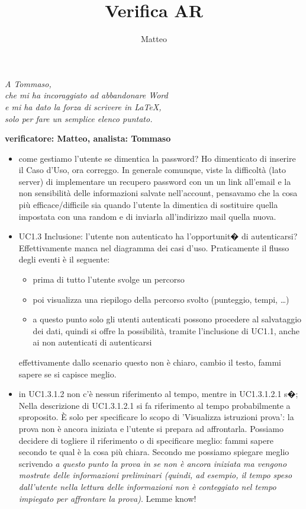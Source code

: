 \documentclass[11pt,a4paper]{article}
\author{Matteo}
\title{Verifica AR}
\begin{document}
	\maketitle
	\newpage
	\begin{flushright}
		\textit {A Tommaso, \\ che mi ha incoraggiato ad abbandonare Word\\ e  mi ha dato la forza di scrivere in \LaTeX, \\ solo per fare un semplice elenco puntato.}
	\end{flushright}
	\newpage
	\textbf{verificatore: Matteo, analista: Tommaso}
	\begin{itemize}
		\item come gestiamo l'utente se dimentica la password?
			\subitem Ho dimenticato di inserire il Caso d'Uso, ora correggo. In generale comunque, viste la difficoltà (lato server) di implementare un recupero password con un un link all'email e la non sensibilità delle informazioni salvate nell'account, pensavamo che la cosa più efficace/difficile sia quando l'utente la dimentica di sostituire quella impostata con una random e di inviarla all'indirizzo mail quella nuova.
		\item UC1.3 Inclusione: l'utente non autenticato ha l'opportunit� di autenticarsi?
			\subitem Effettivamente manca nel diagramma dei casi d'uso. Praticamente il flusso degli eventi è il seguente: \begin{itemize}
				\item prima di tutto l'utente svolge un percorso
				\item poi visualizza una riepilogo della percorso svolto (punteggio, tempi, …)
				\item a questo punto solo gli utenti autenticati possono procedere al salvataggio dei dati, quindi si offre la possibilità, tramite l'inclusione di UC1.1, anche ai non autenticati di autenticarsi
			\end{itemize}
			effettivamente dallo scenario questo non è chiaro, cambio il testo, fammi sapere se si capisce meglio.
		\item in UC1.3.1.2 non c'è nessun riferimento al tempo, mentre in UC1.3.1.2.1 s�;
			\subitem Nella descrizione di UC1.3.1.2.1 si fa riferimento al tempo probabilmente a sproposito. È solo per specificare lo scopo di 'Visualizza istruzioni prova': la prova non è ancora iniziata e l'utente si prepara ad affrontarla. Possiamo decidere di togliere il riferimento o di specificare meglio: fammi sapere secondo te qual è la cosa più chiara. Secondo me possiamo spiegare meglio scrivendo \textit{a questo punto la prova in se non è ancora iniziata ma vengono mostrate delle informazioni preliminari (quindi, ad esempio, il tempo speso dall'utente nella lettura delle informazioni non è conteggiato nel tempo impiegato per affrontare la prova)}. Lemme know!

\end{itemize}
\end{document}
